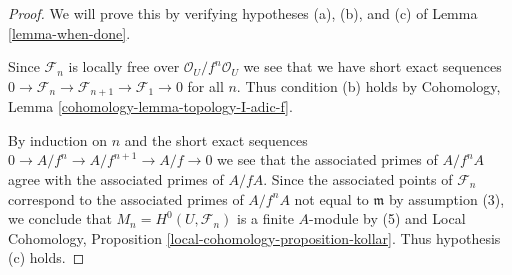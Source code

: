 \begin{proof}
We will prove this by verifying hypotheses (a), (b), and (c) of
Lemma \ref{lemma-when-done}.

\medskip\noindent
Since $\mathcal{F}_n$ is locally free over $\mathcal{O}_U/f^n\mathcal{O}_U$
we see that we have short exact sequences
$0 \to \mathcal{F}_n \to \mathcal{F}_{n + 1} \to \mathcal{F}_1 \to 0$
for all $n$. Thus condition (b) holds by
Cohomology, Lemma \ref{cohomology-lemma-topology-I-adic-f}.

\medskip\noindent
By induction on $n$ and the short exact sequences
$0 \to A/f^n \to A/f^{n + 1} \to A/f \to 0$ we see that
the associated primes of $A/f^nA$ agree with the associated
primes of $A/fA$. Since the associated points of $\mathcal{F}_n$
correspond to the associated primes of $A/f^nA$ not equal to $\mathfrak m$
by assumption (3), we conclude that
$M_n = H^0(U, \mathcal{F}_n)$ is a finite $A$-module by (5) and
Local Cohomology, Proposition \ref{local-cohomology-proposition-kollar}.
Thus hypothesis (c) holds.


\end{proof}
